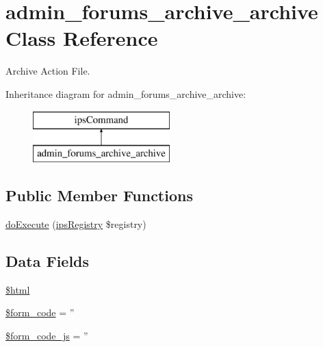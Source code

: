 \hypertarget{classadmin__forums__archive__archive}{\section{admin\-\_\-forums\-\_\-archive\-\_\-archive Class Reference}
\label{classadmin__forums__archive__archive}
}


Archive Action File.  


Inheritance diagram for admin\-\_\-forums\-\_\-archive\-\_\-archive\-:\begin{figure}[H]
\begin{center}
\leavevmode
\includegraphics[height=2.000000cm]{classadmin__forums__archive__archive}
\end{center}
\end{figure}
\subsection*{Public Member Functions}
\begin{DoxyCompactItemize}
\item 
\hyperlink{classadmin__forums__archive__archive_afbc4e912a0604b94d47d66744c64d8ba}{do\-Execute} (\hyperlink{classips_registry}{ips\-Registry} \$registry)
\end{DoxyCompactItemize}
\subsection*{Data Fields}
\begin{DoxyCompactItemize}
\item 
\hyperlink{classadmin__forums__archive__archive_a6f96e7fc92441776c9d1cd3386663b40}{\$html}
\item 
\hyperlink{classadmin__forums__archive__archive_af28aee726fa3eb6c355d08a2ab655e03}{\$form\-\_\-code} = ''
\item 
\hyperlink{classadmin__forums__archive__archive_ac68fe8a02a2efd63c3271179f4b4fbb7}{\$form\-\_\-code\-\_\-js} = ''
\end{DoxyCompactItemize}
